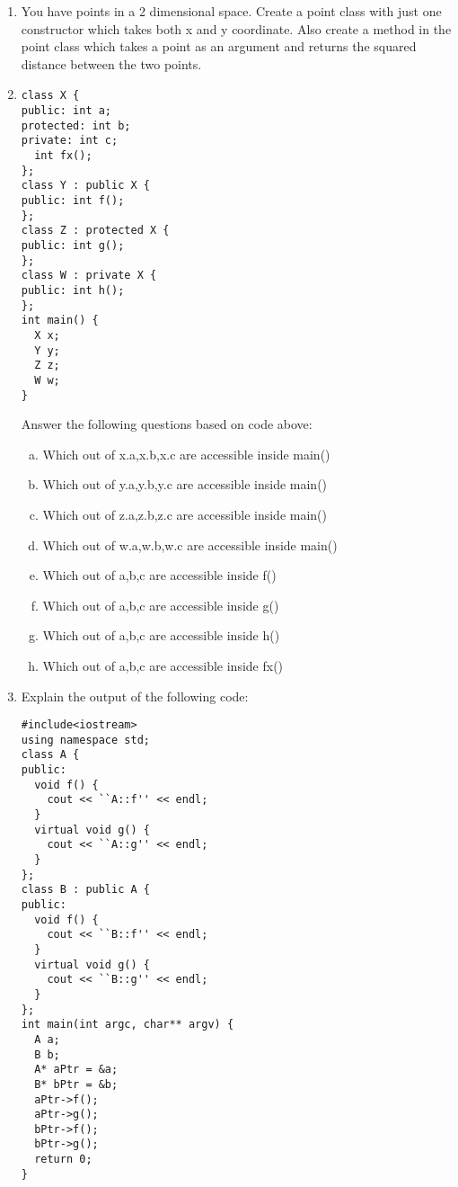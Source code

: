 \documentclass[12pt]{article}
\begin{document}
\begin{enumerate}
    \item You have points in a 2 dimensional space. Create a point class with just one constructor which takes both x and y coordinate. Also create a method in the point class which takes a point as an argument and returns the squared distance between the two points.\vspace*{100mm}

    \item 
      \begin{lstlisting}
class X {
public: int a;
protected: int b;
private: int c;
  int fx();
};
class Y : public X {
public: int f();
};
class Z : protected X {
public: int g();
};
class W : private X {
public: int h();
};
int main() {
  X x;
  Y y;
  Z z;
  W w;
}
      \end{lstlisting}
      Answer the following questions based on code above:
      \begin{enumerate}[a)]
      \item Which out of x.a,x.b,x.c are accessible inside main()
      \item Which out of y.a,y.b,y.c are accessible inside main()
      \item Which out of z.a,z.b,z.c are accessible inside main()
      \item Which out of w.a,w.b,w.c are accessible inside main()
      \item Which out of a,b,c are accessible inside f()
      \item Which out of a,b,c are accessible inside g()
      \item Which out of a,b,c are accessible inside h()
      \item Which out of a,b,c are accessible inside fx()
      \end{enumerate}\newpage
      \item Explain the output of the following code:
        \begin{lstlisting}
#include<iostream>
using namespace std;
class A {
public:
  void f() {
    cout << ``A::f'' << endl;
  }
  virtual void g() {
    cout << ``A::g'' << endl;
  }
};
class B : public A {
public:
  void f() {
    cout << ``B::f'' << endl;
  }
  virtual void g() {
    cout << ``B::g'' << endl;
  }
};
int main(int argc, char** argv) {
  A a;
  B b;
  A* aPtr = &a;
  B* bPtr = &b;
  aPtr->f();
  aPtr->g();
  bPtr->f();
  bPtr->g();
  return 0;
}
        \end{lstlisting}
\end{enumerate}
\end{document}
